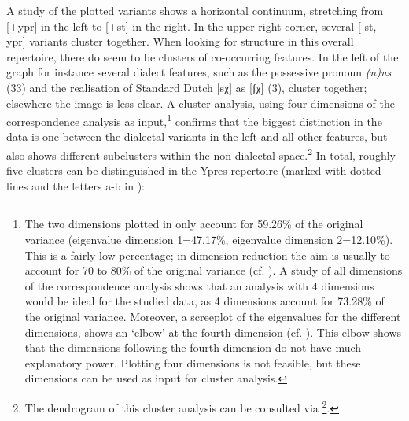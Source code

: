 \documentclass[output=paper]{LSP/langsci}
\begin{document}
A study of the plotted variants shows a horizontal continuum, stretching from [+ypr] in the left to [+st] in the right. In the upper right corner, several [-st, -ypr] variants cluster together. When looking for structure in this overall repertoire, there do seem to be clusters of co-occurring features. In the left of the graph for instance several dialect features, such as the possessive pronoun \textit{(n)us} (33) and the realisation of Standard Dutch [sχ] as [ʃχ] (3), cluster together; elsewhere the image is less clear. A cluster analysis, using four dimensions of the correspondence analysis as input,\footnote{The two dimensions plotted in  only account for 59.26\% of the original variance (eigenvalue dimension 1=47.17\%, eigenvalue dimension 2=12.10\%). This is a fairly low percentage; in dimension reduction the aim is usually to account for 70 to 80\% of the original variance (cf. \citealt[83--84]{di_franco_factor_2014}). A study of all dimensions of the correspondence analysis shows that an analysis with 4 dimensions would be ideal for the studied data, as 4 dimensions account for 73.28\% of the original variance. Moreover, a screeplot of the eigenvalues for the different dimensions, shows an ‘elbow’ at the fourth dimension (cf. \citealt[83--84]{di_franco_factor_2014}). This elbow shows that the dimensions following the fourth dimension do not have much explanatory power. Plotting four dimensions is not feasible, but these dimensions can be used as input for cluster analysis.} confirms that the biggest distinction in the data is one between the dialectal variants in the left and all other features, but also shows different subclusters within the non-dialectal space.\footnote{The dendrogram of this cluster analysis can be consulted via \footnote{\url{https://zenodo.org/record/33588}}.} In total, roughly five clusters can be distinguished in the Ypres repertoire (marked with dotted lines and the letters a-b in ):
\end{document}

